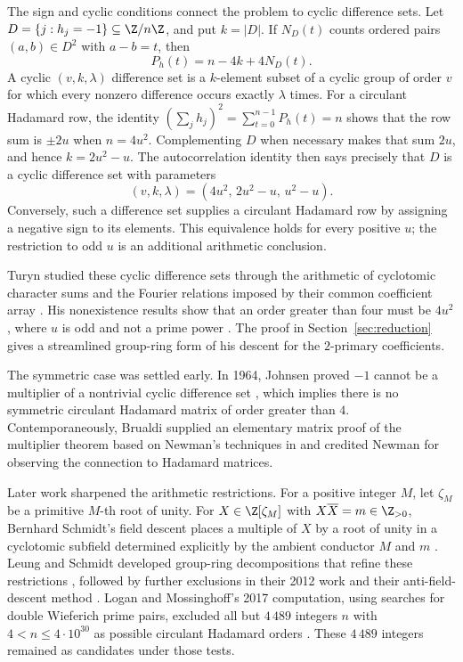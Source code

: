 The sign and cyclic conditions connect the problem to cyclic
difference sets. Let \(D=\{j:h_j=-1\}\subseteq\Z/n\Z\), and put
\(k=|D|\). If \(N_D(t)\) counts ordered pairs \((a,b)\in D^2\) with
\(a-b=t\), then
\[
 P_h(t)=n-4k+4N_D(t).
\]
A cyclic \((v,k,\lambda)\) difference set is a \(k\)-element subset
of a cyclic group of order \(v\) for which every nonzero difference
occurs exactly \(\lambda\) times. For a circulant Hadamard row, the identity
\((\sum_jh_j)^2=\sum_{t=0}^{n-1}P_h(t)=n\) shows that the row sum
is \(\pm2u\) when \(n=4u^2\). Complementing \(D\) when necessary
makes that sum \(2u\), and hence
\(k=2u^2-u\). The autocorrelation identity then says precisely that
\(D\) is a cyclic difference set with parameters
\[
 (v,k,\lambda)=(4u^2,\,2u^2-u,\,u^2-u).
\]
Conversely, such a difference set supplies a circulant Hadamard row
by assigning a negative sign to its elements. This equivalence holds
for every positive \(u\); the restriction to odd \(u\) is an additional
arithmetic conclusion.

Turyn studied these cyclic difference sets through the arithmetic of
cyclotomic character sums and the Fourier relations imposed by their
common coefficient array \cite[pp.~319--323]{Turyn1965}. His
nonexistence results show that an order greater than four must be
\(4u^2\), where \(u\) is odd and not a prime power
\cite[Corollary~2 to Theorem~6, p.~333, and Theorem~8 with its
Corollary, pp.~335--336]{Turyn1965}. The proof in
Section~\ref{sec:reduction} gives a streamlined group-ring form of
his descent for the \(2\)-primary coefficients.

The symmetric case was settled early. In 1964, Johnsen proved \(-1\)
cannot be a multiplier of a nontrivial cyclic difference set \cite{Johnsen1964},
which implies there is no symmetric circulant Hadamard matrix of order
greater than \(4\). Contemporaneously, Brualdi supplied an elementary matrix
proof of the multiplier theorem \cite{Brualdi1965} based on Newman's techniques
in \cite{Newman1963} and credited Newman for observing the connection to 
Hadamard matrices.

Later work sharpened the arithmetic restrictions. For a positive
integer \(M\), let \(\zeta_M\) be a primitive \(M\)-th root of unity.
For \(X\in\Z[\zeta_M]\) with \(X\overline X=m\in\Z_{>0}\),
Bernhard Schmidt's field descent places a multiple of \(X\) by a root
of unity in a cyclotomic subfield determined explicitly by the ambient
conductor \(M\) and \(m\) \cite{Schmidt1999}. Leung and Schmidt
developed group-ring decompositions that refine these restrictions
\cite{LeungSchmidt2005}, followed by further exclusions in their
2012 work and their anti-field-descent method
\cite{LeungSchmidt2012,LeungSchmidt2016}. Logan and Mossinghoff's
2017 computation, using searches for double Wieferich prime pairs,
excluded all but \(4\,489\) integers \(n\) with
\(4<n\leq4\cdot10^{30}\) as possible circulant Hadamard orders
\cite{LoganMossinghoff2017}. These \(4\,489\) integers remained
as candidates under those tests.

